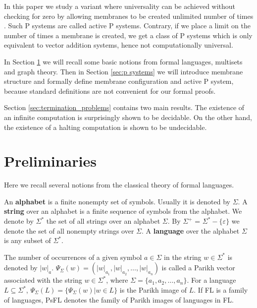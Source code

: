 \documentclass[llncs,submission,copyright,creativecommons]{../lib/lncs/llncs}
\def\eps{\varepsilon}
\begin{document}
In this paper we study a variant where universality can be achieved without checking for zero by allowing membranes to be created unlimited number of times \cite{Ibarra05Active}. Such P systems are called active P systems. Contrary, if we place a limit on the number of times a membrane is created, we get a class of P systems which is only equivalent to vector addition systems, hence not computationally universal.

In Section \ref{sec:preliminaries} we will recall some basic notions from formal languages, multisets and graph theory. Then in Section \ref{sec:p systems} we will introduce membrane structure and formally define membrane configuration and active P system, because standard definitions are not convenient for our formal proofs.

Section \ref{sec:termination_problems} contains two main results. The existence of an infinite computation is surprisingly shown to be decidable.
On the other hand, the existence of a halting computation is shown to be undecidable.


\section{Preliminaries}
\label{sec:preliminaries}

Here we recall several notions from the classical theory of formal languages.

An {\bf alphabet} is a finite nonempty set of symbols. Usually it is denoted by $\Sigma$. A {\bf string} over an alphabet is a finite sequence of symbols from the alphabet. We denote by $\Sigma^*$ the set of all strings over an alphabet $\Sigma$. By $\Sigma^+$ = $\Sigma^* - \{\eps\}$ we denote the set of all nonempty strings over $\Sigma$. A {\bf language} over the alphabet $\Sigma$ is any subset of $\Sigma^*$.

The number of occurrences of a given symbol $a\in \Sigma$ in the string $w\in \Sigma^*$ is denoted by $|w|_a$. $\Psi_\Sigma(w)=(|w|_{a_1},|w|_{a_2},\dots,|w|_{a_n})$ is called a Parikh vector associated with the string $w\in \Sigma^*$, where $\Sigma=\{a_1,a_2,\dots, a_n\}$. For a language $L\subseteq \Sigma^*$, $\Psi_\Sigma(L)=\{\Psi_\Sigma(w)|w\in L\}$ is the Parikh image of $L$. If FL is a family of languages, PsFL denotes the family of Parikh images of languages in FL.
\end{document}

